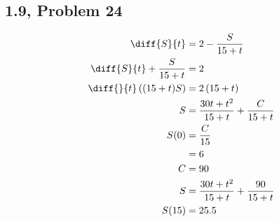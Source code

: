 \documentclass[10pt]{mypackage}
\begin{document}
\subsection{1.9, Problem 24}%
\begin{align*}
  \diff{S}{t} &= 2 - \frac{S}{15 + t}\\
  \diff{S}{t} + \frac{S}{15+t} &= 2\\
  \diff{}{t}\left((15+t)S\right) &= 2\left(15 + t\right)\\
  S &= \frac{30t + t^2}{15+t} + \frac{C}{15+t}\\
  S(0) &= \frac{C}{15}\\
       &= 6\\
  C &= 90\\
  S &= \frac{30t + t^2}{15+t} + \frac{90}{15+t}\\
  S(15) &= 25.5
\end{align*}
\end{document}
